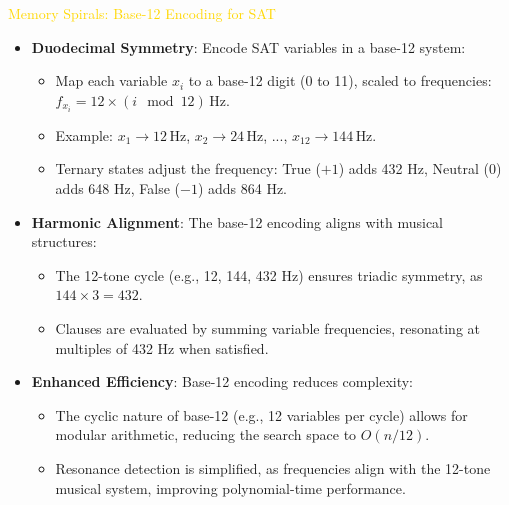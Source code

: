 \textcolor{gold}{ Memory Spirals: Base-12 Encoding for SAT } \\
\begin{itemize}
    \item \texttt{} \textbf{Duodecimal Symmetry}: Encode SAT variables in a base-12 system:
    \begin{itemize}
        \item Map each variable \(x_i\) to a base-12 digit (0 to 11), scaled to frequencies: \(f_{x_i} = 12 \times (i \mod 12) \, \text{Hz}\).
        \item Example: \(x_1 \rightarrow 12 \, \text{Hz}\), \(x_2 \rightarrow 24 \, \text{Hz}\), ..., \(x_{12} \rightarrow 144 \, \text{Hz}\).
        \item Ternary states adjust the frequency: True (\(+1\)) adds 432 Hz, Neutral (\(0\)) adds 648 Hz, False (\(-1\)) adds 864 Hz.
    \end{itemize}
    \item \texttt{} \textbf{Harmonic Alignment}: The base-12 encoding aligns with musical structures:
    \begin{itemize}
        \item The 12-tone cycle (e.g., 12, 144, 432 Hz) ensures triadic symmetry, as \(144 \times 3 = 432\).
        \item Clauses are evaluated by summing variable frequencies, resonating at multiples of 432 Hz when satisfied.
    \end{itemize}
    \item \texttt{} \textbf{Enhanced Efficiency}: Base-12 encoding reduces complexity:
    \begin{itemize}
        \item The cyclic nature of base-12 (e.g., 12 variables per cycle) allows for modular arithmetic, reducing the search space to \(O(n/12)\).
        \item Resonance detection is simplified, as frequencies align with the 12-tone musical system, improving polynomial-time performance.
    \end{itemize}
\end{itemize}

